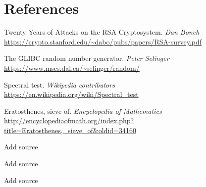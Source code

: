 \documentclass{article}
\begin{document}
\section{References}
\begin{thebibliography}{6}
Twenty Years of Attacks on the RSA Cryptosystem.
\textit{Dan Boneh}
\\\url{https://crypto.stanford.edu/~dabo/pubs/papers/RSA-survey.pdf}

The GLIBC random number generator.
\textit{Peter Selinger}
\\\url{https://www.mscs.dal.ca/~selinger/random/}

Spectral test.
\textit{Wikipedia contributors}
\\\url{https://en.wikipedia.org/wiki/Spectral_test}

Eratosthenes, sieve of.
\textit{Encyclopedia of Mathematics}\\
\url{http://encyclopediaofmath.org/index.php?title=Eratosthenes,_sieve_of&oldid=34160}

Add source

Add source

Add source
\end{thebibliography}
         
\end{document}
